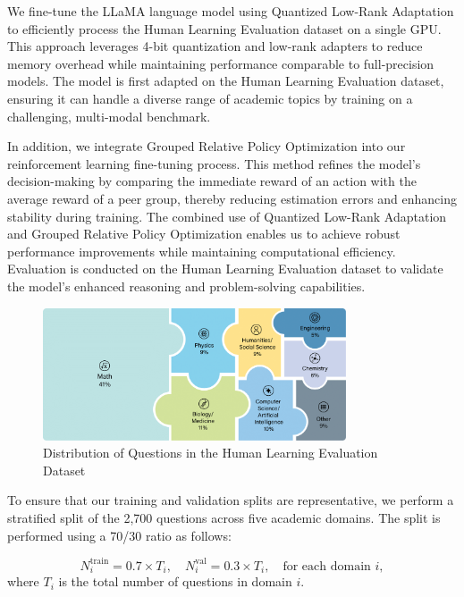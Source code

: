 \documentclass{svproc}
\begin{document}
We fine-tune the LLaMA language model using Quantized Low-Rank Adaptation to efficiently process the Human Learning Evaluation dataset on a single GPU. This approach leverages 4-bit quantization and low-rank adapters to reduce memory overhead while maintaining performance comparable to full-precision models. The model is first adapted on the Human Learning Evaluation dataset, ensuring it can handle a diverse range of academic topics by training on a challenging, multi-modal benchmark.

In addition, we integrate Grouped Relative Policy Optimization into our reinforcement learning fine-tuning process. This method refines the model’s decision-making by comparing the immediate reward of an action with the average reward of a peer group, thereby reducing estimation errors and enhancing stability during training. The combined use of Quantized Low-Rank Adaptation and Grouped Relative Policy Optimization enables us to achieve robust performance improvements while maintaining computational efficiency. Evaluation is conducted on the Human Learning Evaluation dataset to validate the model’s enhanced reasoning and problem-solving capabilities.


\begin{figure}[H]
  \centering  
  \includegraphics[width=0.8\textwidth]{figures/dataset.png}
  \caption{Distribution of Questions in the Human Learning Evaluation Dataset}
  \label{fig:dataset}
\end{figure}

To ensure that our training and validation splits are representative, we perform a stratified split of the 2,700 questions across five academic domains. The split is performed using a 70/30 ratio as follows:

\begin{equation}
  N^{\text{train}}_i = 0.7 \times T_i, \quad N^{\text{val}}_i = 0.3 \times T_i, \quad \text{for each domain } i,
\end{equation}
where \(T_i\) is the total number of questions in domain \(i\).
\end{document}
